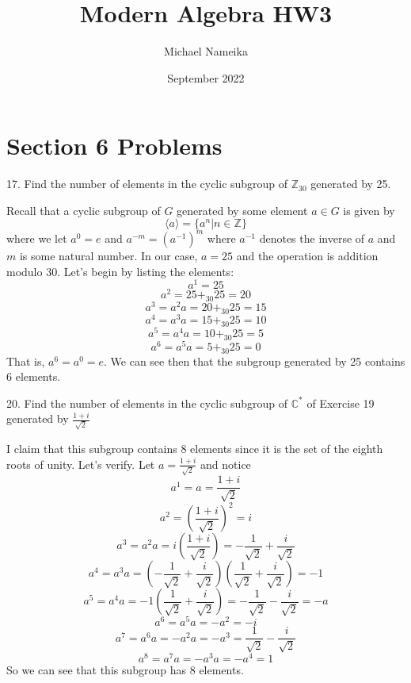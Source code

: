 \documentclass{article}
\title{Modern Algebra HW3}
\author{Michael Nameika}
\date{September 2022}
\begin{document}
\maketitle

\section*{Section 6 Problems}

17. Find the number of elements in the cyclic subgroup of $\mathbb{Z}_{30}$ generated by 25. 
\newline

Recall that a cyclic subgroup of $G$ generated by some element $a \in G$ is given by
\[\langle a\rangle = \{a^n | n \in \mathbb{Z}\}\]
where we let $a^0 = e$ and $a^{-m} = (a^{-1})^m$ where $a^{-1}$ denotes the inverse of $a$ and $m$ is some natural number. In our case, $a = 25$ and the operation is addition modulo 30. Let's begin by listing the elements:
\[a^1 = 25\]
\[a^2 = 25 +_{30} 25 = 20 \]
\[a^3 = a^2a = 20 +_{30} 25 = 15\]
\[a^4 = a^3a = 15 +_{30} 25 = 10\]
\[a^5 = a^4a = 10 +_{30} 25 = 5\]
\[a^6 = a^5a = 5 +_{30} 25 = 0\]
That is, $a^6 = a^0 = e$. We can see then that the subgroup generated by 25 contains 6 elements.
\newline

20. Find the number of elements in the cyclic subgroup of $\mathbb{C}^*$ of Exercise 19 generated by $\frac{1 + i}{\sqrt{2}}$
\newline

I claim that this subgroup contains 8 elements since it is the set of the eighth roots of unity. Let's verify. Let $a = \frac{1 + i}{\sqrt{2}}$ and notice
\[a^1 = a = \frac{1 + i}{\sqrt{2}}\]
\[a^2 = \left(\frac{1 + i}{\sqrt{2}}\right)^2 = i\]
\[a^3 = a^2a = i\left(\frac{1 + i}{\sqrt{2}}\right) = -\frac{1}{\sqrt{2}} + \frac{i}{\sqrt{2}}\]
\[a^4 = a^3a = \left( -\frac{1}{\sqrt{2}} + \frac{i}{\sqrt{2}} \right)\left( \frac{1}{\sqrt{2}} + \frac{i}{\sqrt{2}} \right) = -1\]
\[a^5 = a^4a = -1\left( \frac{1}{\sqrt{2}} + \frac{i}{\sqrt{2}} \right) = -\frac{1}{\sqrt{2}} - \frac{i}{\sqrt{2}} = -a\]
\[a^6 = a^5a = -a^2 = -i\]
\[a^7 = a^6a = -a^2a = -a^3 = \frac{1}{\sqrt{2}} - \frac{i}{\sqrt{2}}\]
\[a^8 = a^7a = -a^3a = -a^4 = 1\]
So we can see that this subgroup has 8 elements.
\end{document}
